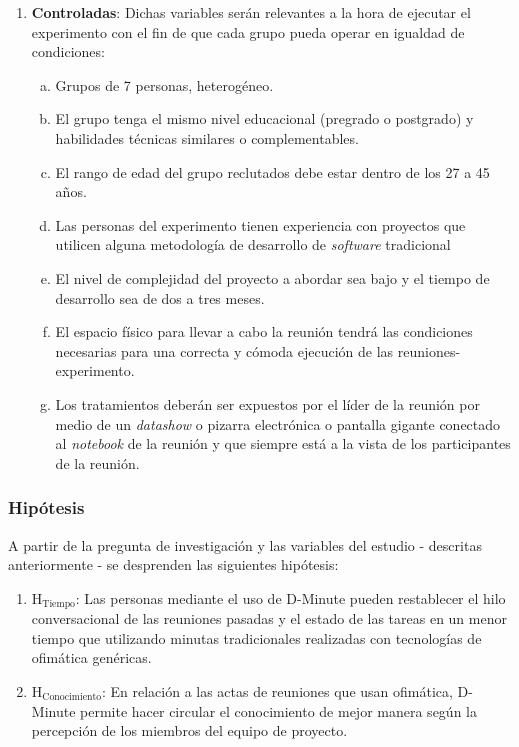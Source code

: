 \begin{enumerate}[1.]
    \item \textbf{Controladas}: Dichas variables serán relevantes a la hora de ejecutar el experimento con el fin de que cada grupo pueda operar en igualdad de condiciones:
    \begin{enumerate}[a.]
	    \item Grupos de 7 personas, heterogéneo.
	    \item El grupo tenga el mismo nivel educacional (pregrado o postgrado) y habilidades técnicas similares o complementables.
	    \item El rango de edad del grupo reclutados debe estar dentro de los 27 a 45 años.
	    \item Las personas del experimento tienen experiencia con proyectos que utilicen alguna metodología de desarrollo de \textit{software} tradicional
	    \item El nivel de complejidad del proyecto a abordar sea bajo y el tiempo de desarrollo sea de dos a tres meses.
	    \item El espacio físico para llevar a cabo la reunión tendrá las condiciones necesarias para una correcta y cómoda ejecución de las reuniones-experimento.
	    \item Los tratamientos deberán ser expuestos por el líder de la reunión por medio de un \textit{datashow} o pizarra electrónica o pantalla gigante conectado al \textit{notebook} de la reunión y que siempre está a la vista de los participantes de la reunión.
    \end{enumerate}

\end{enumerate}

\subsubsection{Hipótesis}

A partir de la pregunta de investigación y las variables del estudio - descritas anteriormente - se desprenden las siguientes hipótesis:

\begin{enumerate}[1.]
	\item $\mathrm{H_{Tiempo}}$: Las personas mediante el uso de D-Minute pueden restablecer el hilo conversacional de las reuniones pasadas y el estado de las tareas en un menor tiempo que utilizando minutas tradicionales realizadas con tecnologías de ofimática genéricas.
	\item $\mathrm{H_{Conocimiento}}$: En relación a las actas de reuniones que usan ofimática, D-Minute permite hacer circular el conocimiento de mejor manera según la percepción de los miembros del equipo de proyecto.
\end{enumerate}

